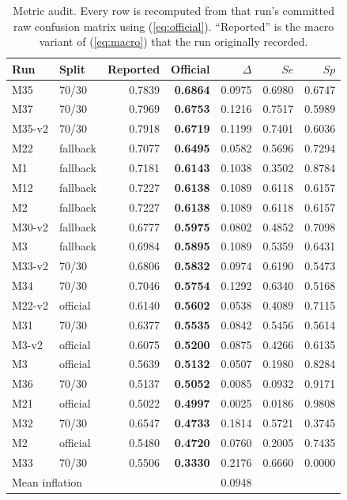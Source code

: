 \documentclass[journal,onecolumn]{IEEEtran}
\newcommand{\best}[1]{\textbf{#1}}
\begin{document}
\begin{table}[!t]
\centering
\caption{Metric audit. Every row is recomputed from that run's committed raw
confusion matrix using (\ref{eq:official}). ``Reported'' is the macro variant of
(\ref{eq:macro}) that the run originally recorded.}
\label{tab:metricaudit}
\begin{tabular}{llrrrrr}
\toprule
Run & Split & Reported & \best{Official} & $\Delta$ & $Se$ & $Sp$ \\
\midrule
M35    & 70/30    & 0.7839 & \best{0.6864} & 0.0975 & 0.6980 & 0.6747 \\
M37    & 70/30    & 0.7969 & \best{0.6753} & 0.1216 & 0.7517 & 0.5989 \\
M35-v2 & 70/30    & 0.7918 & \best{0.6719} & 0.1199 & 0.7401 & 0.6036 \\
M22    & fallback & 0.7077 & \best{0.6495} & 0.0582 & 0.5696 & 0.7294 \\
M1     & fallback & 0.7181 & \best{0.6143} & 0.1038 & 0.3502 & 0.8784 \\
M12    & fallback & 0.7227 & \best{0.6138} & 0.1089 & 0.6118 & 0.6157 \\
M2     & fallback & 0.7227 & \best{0.6138} & 0.1089 & 0.6118 & 0.6157 \\
M30-v2 & fallback & 0.6777 & \best{0.5975} & 0.0802 & 0.4852 & 0.7098 \\
M3     & fallback & 0.6984 & \best{0.5895} & 0.1089 & 0.5359 & 0.6431 \\
M33-v2 & 70/30    & 0.6806 & \best{0.5832} & 0.0974 & 0.6190 & 0.5473 \\
M34    & 70/30    & 0.7046 & \best{0.5754} & 0.1292 & 0.6340 & 0.5168 \\
M22-v2 & official & 0.6140 & \best{0.5602} & 0.0538 & 0.4089 & 0.7115 \\
M31    & 70/30    & 0.6377 & \best{0.5535} & 0.0842 & 0.5456 & 0.5614 \\
M3-v2  & official & 0.6075 & \best{0.5200} & 0.0875 & 0.4266 & 0.6135 \\
M3     & official & 0.5639 & \best{0.5132} & 0.0507 & 0.1980 & 0.8284 \\
M36    & 70/30    & 0.5137 & \best{0.5052} & 0.0085 & 0.0932 & 0.9171 \\
M21    & official & 0.5022 & \best{0.4997} & 0.0025 & 0.0186 & 0.9808 \\
M32    & 70/30    & 0.6547 & \best{0.4733} & 0.1814 & 0.5721 & 0.3745 \\
M2     & official & 0.5480 & \best{0.4720} & 0.0760 & 0.2005 & 0.7435 \\
M33    & 70/30    & 0.5506 & \best{0.3330} & 0.2176 & 0.6660 & 0.0000 \\
\midrule
\multicolumn{4}{l}{Mean inflation} & 0.0948 & & \\
\bottomrule
\end{tabular}


\end{table}
\end{document}
